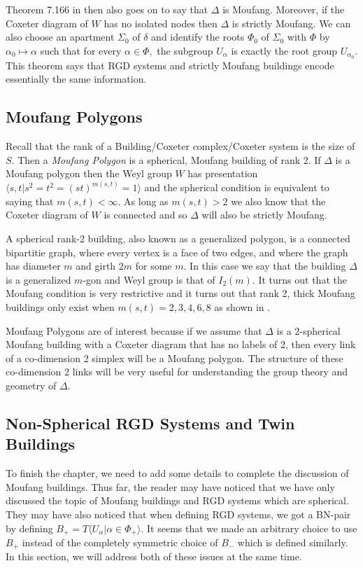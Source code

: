 \documentclass[class=book, crop=false,12 pt]{standalone}
\begin{document}
Theorem 7.166 in \cite{buildings} then also goes on to say that $\Delta$ is Moufang. Moreover, if the Coxeter diagram of $W$ has no isolated nodes then $\Delta$ is strictly Moufang. We can also choose an apartment $\Sigma_0$ of $\delta$ and identify the roots $\Phi_0$ of $\Sigma_0$ with $\Phi$ by $\alpha_0\mapsto \alpha$ such that for every $\alpha\in \Phi,$ the subgroup $U_\alpha$ is exactly the root group $U_{\alpha_0}.$ This theorem says that RGD systems and strictly Moufang buildings encode essentially the same information.

\subsection{Moufang Polygons}
Recall that the rank of a Building/Coxeter complex/Coxeter system is the size of $S.$ Then a \emph{Moufang Polygon} is a spherical, Moufang building of rank 2. If $\Delta$ is a Moufang polygon then the Weyl group $W$ has presentation $\langle s,t|s^2=t^2=(st)^{m(s,t)}=1\rangle$ and the spherical condition is equivalent to saying that $m(s,t)<\infty.$ As long as $m(s,t)>2$ we also know that the Coxeter diagram of $W$ is connected and so $\Delta$ will also be strictly Moufang. 

A spherical rank-2 building, also known as a generalized polygon, is a connected bipartitie graph, where every vertex is a face of two edges, and where the graph has diameter $m$ and girth $2m$ for some $m.$ In this case we say that the building $\Delta$ is a generalized $m$-gon and Weyl group is that of $I_2(m).$ It turns out that the Moufang condition is very restrictive and it turns out that rank 2, thick Moufang buildings only exist when $m(s,t)=2,3,4,6,8$ as shown in \cite{poly}.

Moufang Polygons are of interest because if we assume that $\Delta$ is a 2-spherical Moufang building with a Coxeter diagram that has no labels of 2, then every link of a co-dimension 2 simplex will be a Moufang polygon. The structure of these co-dimension 2 links will be very useful for understanding the group theory and geometry of $\Delta.$ 

\subsection{Non-Spherical RGD Systems and Twin Buildings}
To finish the chapter, we need to add some details to complete the discussion of Moufang buildings. Thus far, the reader may have noticed that we have only discussed the topic of Moufang buildings and RGD systems which are spherical. They may have also noticed that when defining RGD systems, we got a BN-pair by defining $B_+=T\langle U_\alpha|\alpha\in \Phi_+\rangle.$ It seems that we made an arbitrary choice to use $B_+$ instead of the completely symmetric choice of $B_-$ which is defined similarly. In this section, we will address both of these issues at the same time.
\end{document}
